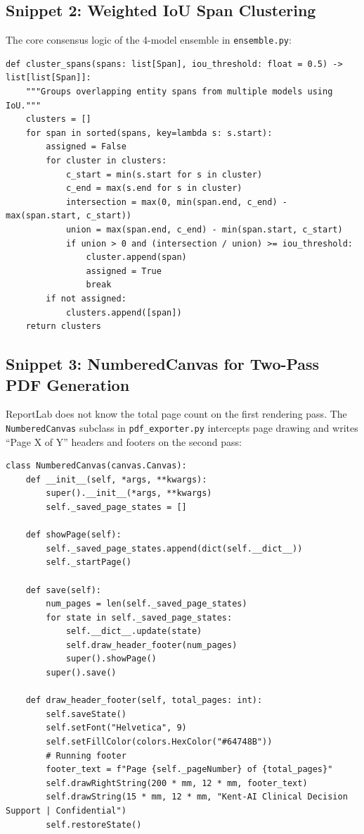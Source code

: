 \subsection{Snippet 2: Weighted IoU Span Clustering}
The core consensus logic of the 4-model ensemble in \texttt{ensemble.py}:

\begin{lstlisting}[style=python, caption={Span Clustering via Intersection-over-Union}]
def cluster_spans(spans: list[Span], iou_threshold: float = 0.5) -> list[list[Span]]:
    """Groups overlapping entity spans from multiple models using IoU."""
    clusters = []
    for span in sorted(spans, key=lambda s: s.start):
        assigned = False
        for cluster in clusters:
            c_start = min(s.start for s in cluster)
            c_end = max(s.end for s in cluster)
            intersection = max(0, min(span.end, c_end) - max(span.start, c_start))
            union = max(span.end, c_end) - min(span.start, c_start)
            if union > 0 and (intersection / union) >= iou_threshold:
                cluster.append(span)
                assigned = True
                break
        if not assigned:
            clusters.append([span])
    return clusters
\end{lstlisting}

\subsection{Snippet 3: NumberedCanvas for Two-Pass PDF Generation}
ReportLab does not know the total page count on the first rendering pass. The \texttt{NumberedCanvas} subclass in \texttt{pdf\_exporter.py} intercepts page drawing and writes ``Page X of Y'' headers and footers on the second pass:

\begin{lstlisting}[style=python, caption={Two-Pass Running Header/Footer Canvas in ReportLab}]
class NumberedCanvas(canvas.Canvas):
    def __init__(self, *args, **kwargs):
        super().__init__(*args, **kwargs)
        self._saved_page_states = []

    def showPage(self):
        self._saved_page_states.append(dict(self.__dict__))
        self._startPage()

    def save(self):
        num_pages = len(self._saved_page_states)
        for state in self._saved_page_states:
            self.__dict__.update(state)
            self.draw_header_footer(num_pages)
            super().showPage()
        super().save()

    def draw_header_footer(self, total_pages: int):
        self.saveState()
        self.setFont("Helvetica", 9)
        self.setFillColor(colors.HexColor("#64748B"))
        # Running footer
        footer_text = f"Page {self._pageNumber} of {total_pages}"
        self.drawRightString(200 * mm, 12 * mm, footer_text)
        self.drawString(15 * mm, 12 * mm, "Kent-AI Clinical Decision Support | Confidential")
        self.restoreState()
\end{lstlisting}

